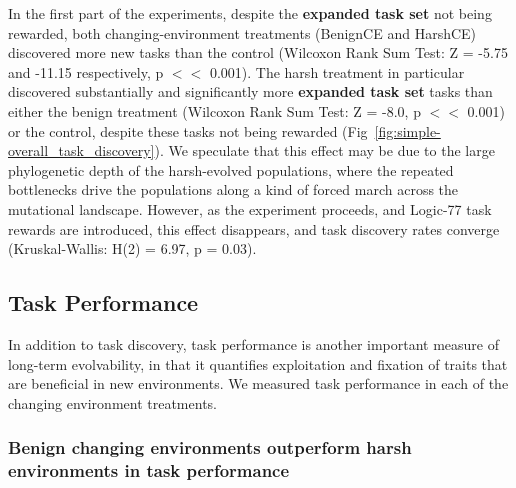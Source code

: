 \documentclass[10pt,letterpaper]{article}
\begin{document}
In the first part of the experiments, despite the \textbf{expanded task set} not being rewarded, both changing-environment treatments (BenignCE and HarshCE) discovered more new tasks than the control (Wilcoxon Rank Sum Test: Z = -5.75 and -11.15 respectively, p $<<$ 0.001). The harsh treatment in particular discovered substantially and significantly more \textbf{expanded task set} tasks than either the benign treatment (Wilcoxon Rank Sum Test: Z = -8.0, p $<<$ 0.001) or the control, despite these tasks not being rewarded (Fig~\ref{fig:simple-overall_task_discovery}). We speculate that this effect may be due to the large phylogenetic depth of the harsh-evolved populations, where the repeated bottlenecks drive the populations along a kind of forced march across the mutational landscape. However, as the experiment proceeds, and Logic-77 task rewards are introduced, this effect disappears, and task discovery rates converge (Kruskal-Wallis: H(2) = 6.97, p = 0.03).









\subsection*{Task Performance}
In addition to task discovery, task performance is another important measure of long-term evolvability, in that it quantifies exploitation and fixation of traits that are beneficial in new environments. We measured task performance in each of the changing environment treatments.

\subsubsection*{Benign changing environments outperform harsh environments in task performance}
\end{document}
